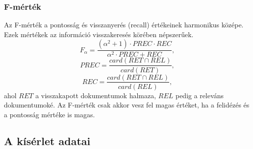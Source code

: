 \subsubsection{F-mérték}
Az F-mérték a pontosság és visszanyerés (recall) értékeinek harmonikus középe. Ezek mértékek az információ visszakeresés körében népszerűek. 
\begin{equation}
F_\alpha = \frac{(\alpha^2 + 1) \cdot PREC \cdot REC}{\alpha^2 \cdot PREC + REC},
\end{equation}
\begin{equation}
PREC = \frac{card(RET \cap REL)}{card(RET)},
\end{equation}
\begin{equation}
REC = \frac{card(RET \cap REL)}{card(REL)},
\end{equation}
ahol $RET$ a visszakapott dokumentumok halmaza, $REL$ pedig a releváns dokumentumoké. Az F-mérték csak akkor vesz fel magas értéket, ha a felidézés és a pontosság mértéke is magas.
\subsection{A kísérlet adatai}





